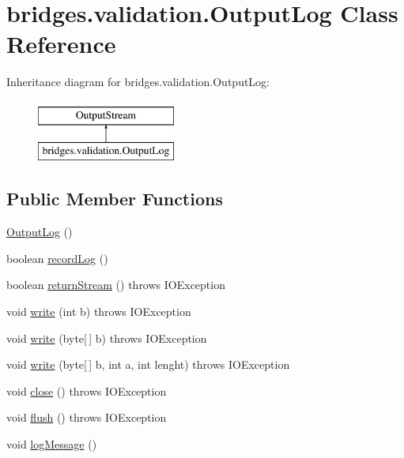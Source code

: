 \hypertarget{classbridges_1_1validation_1_1_output_log}{}\section{bridges.\+validation.\+Output\+Log Class Reference}
\label{classbridges_1_1validation_1_1_output_log}
Inheritance diagram for bridges.\+validation.\+Output\+Log\+:\begin{figure}[H]
\begin{center}
\leavevmode
\includegraphics[height=2.000000cm]{classbridges_1_1validation_1_1_output_log}
\end{center}
\end{figure}
\subsection*{Public Member Functions}
\begin{DoxyCompactItemize}
\item 
\hyperlink{classbridges_1_1validation_1_1_output_log_a47a7efee1dce6f11f3de83d48994a56f}{Output\+Log} ()
\item 
boolean \hyperlink{classbridges_1_1validation_1_1_output_log_aae5e41b4b23adb56e3c97d2c17ad0768}{record\+Log} ()
\item 
boolean \hyperlink{classbridges_1_1validation_1_1_output_log_a4ec6037db31ff9dc0664d341183f296f}{return\+Stream} ()  throws I\+O\+Exception
\item 
void \hyperlink{classbridges_1_1validation_1_1_output_log_a68ed2055f1a0626674675354feeb9d54}{write} (int b)  throws I\+O\+Exception 
\item 
void \hyperlink{classbridges_1_1validation_1_1_output_log_a6489f70aa4e2903456ed05315dd59f31}{write} (byte\mbox{[}$\,$\mbox{]} b)  throws I\+O\+Exception 
\item 
void \hyperlink{classbridges_1_1validation_1_1_output_log_ad0ada8f6ff72218f18b64672690fc94f}{write} (byte\mbox{[}$\,$\mbox{]} b, int a, int lenght)  throws I\+O\+Exception 
\item 
void \hyperlink{classbridges_1_1validation_1_1_output_log_a6ab7881cd35aa11cc830dab4732fe66d}{close} ()  throws I\+O\+Exception
\item 
void \hyperlink{classbridges_1_1validation_1_1_output_log_ab810fd1e3d7e939bcdf1ec38978c02cd}{flush} ()  throws I\+O\+Exception
\item 
void \hyperlink{classbridges_1_1validation_1_1_output_log_aea898d0de8715c1451d4731f3d9ae91d}{log\+Message} ()
\end{DoxyCompactItemize}
